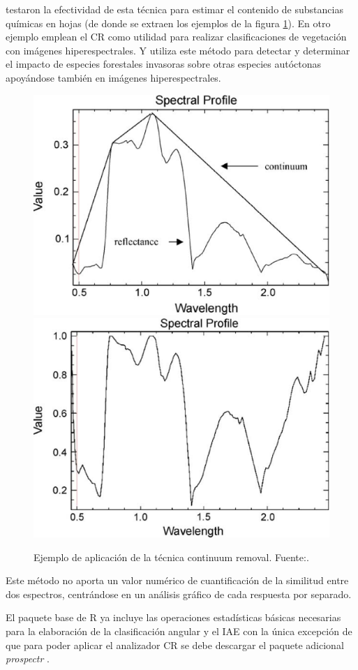 \cite{huang2004estimating} testaron la efectividad de esta técnica para estimar el contenido de substancias químicas en hojas (de donde se extraen los ejemplos de la figura \ref{fig:ejemploCR}). En otro ejemplo \cite{filippi2007effect} emplean el \ac{CR} como utilidad para realizar clasificaciones de vegetación con imágenes hiperespectrales. Y \cite{underwood2003mapping} utiliza este método para detectar y determinar el impacto de especies forestales invasoras sobre otras especies autóctonas apoyándose también en imágenes hiperespectrales.\Sep

\begin{figure}
	\centering
	\includegraphics[width=0.5\linewidth]{./Imagenes/CR1.eps}
	\includegraphics[width=0.5\linewidth]{./Imagenes/CR2.eps}
	\caption[Continuum Removal ejemplo]{Ejemplo de aplicación de la técnica continuum removal. Fuente:\cite{huang2004estimating}.}
	\label{fig:ejemploCR}
\end{figure}

Este método no aporta un valor numérico de cuantificación de la similitud entre dos espectros, centrándose en un análisis gráfico de cada respuesta por separado.\Sep

El paquete base de R ya incluye las operaciones estadísticas básicas necesarias para la elaboración de la clasificación angular y el \ac{IAE} con la única excepción de que para poder aplicar el analizador \ac{CR} se debe descargar el paquete adicional \textit{prospectr} \citep{stevens2014introduction}.\Sep

